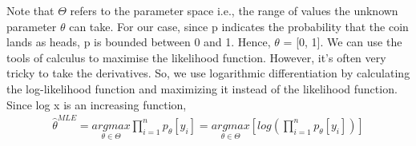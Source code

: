 Note
that $\Theta$ refers to the parameter space i.e., the range of values the unknown parameter $\theta$ can take. For our case, since p indicates the probability that the coin lands as heads, p is bounded between 0 and 1. Hence, $\theta$ = [0, 1]. We can use the tools of calculus to maximise the likelihood function. However, it’s often very tricky to take the derivatives. So, we use logarithmic differentiation by calculating the log-likelihood function and maximizing it instead of the likelihood function. Since log x is an increasing function,
\begin{align*}
    \hat{\theta}^{MLE} = \underset{\theta\in\Theta}{argmax}\prod_{i=1}^n p_\theta[y_i] = \underset{\theta\in\Theta}{argmax}\left[log\left(\prod_{i=1}^n p_\theta[y_i]\right)\right]
\end{align*}

